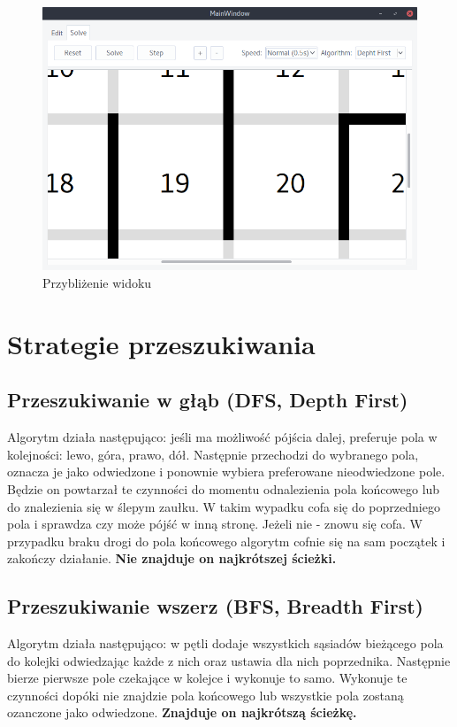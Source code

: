 \documentclass[12pt,a4paper]{article}
\begin{document}
	\begin{figure}[H]
		\centering
		\includegraphics[width=0.8\linewidth]{obrazki/13.png}
		\caption{Przybliżenie widoku}
	\end{figure}
	
	
	\section{Strategie przeszukiwania}
	\subsection{Przeszukiwanie w głąb (DFS, Depth First)}
	Algorytm działa następująco: jeśli ma możliwość pójścia dalej,
	preferuje pola w kolejności: lewo, góra, prawo, dół. Następnie 
	przechodzi do wybranego pola, oznacza je jako odwiedzone i ponownie
	wybiera preferowane nieodwiedzone pole. 
	Będzie on powtarzał te czynności do momentu odnalezienia 
	pola końcowego lub do znalezienia się w ślepym zaułku. W takim	
	wypadku cofa się do poprzedniego pola i sprawdza czy może pójść w 
	inną stronę. Jeżeli nie - znowu się cofa. W przypadku braku
	drogi do pola końcowego algorytm cofnie się na sam początek i
	zakończy działanie. \textbf{Nie znajduje on najkrótszej ścieżki.}
	
	\subsection{Przeszukiwanie wszerz (BFS, Breadth First)}
	Algorytm działa następująco: w pętli dodaje wszystkich sąsiadów 
	bieżącego pola do kolejki odwiedzając każde z nich oraz ustawia 
	dla nich poprzednika. Następnie bierze pierwsze pole czekające w 
	kolejce i wykonuje to samo. Wykonuje te czynności dopóki nie 
	znajdzie pola końcowego lub wszystkie pola zostaną ozanczone jako 
	odwiedzone.
	\textbf{Znajduje on najkrótszą ścieżkę.}
	
\end{document}
